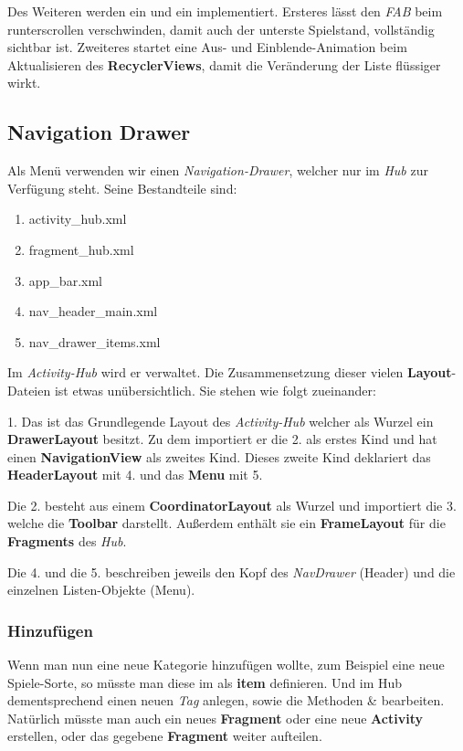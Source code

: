 Des Weiteren werden ein  und ein
 implementiert. Ersteres lässt den \emph{FAB}
beim runterscrollen verschwinden, damit auch der unterste Spielstand,
vollständig sichtbar ist. Zweiteres startet eine Aus- und Einblende-Animation
beim Aktualisieren des \textbf{RecyclerViews}, damit die Veränderung der Liste
flüssiger wirkt.

\subsection{Navigation Drawer}

Als Menü verwenden wir einen \emph{Navigation-Drawer}, welcher nur im \emph{Hub}
zur Verfügung steht. Seine Bestandteile sind:
\begin{enumerate}
\item activity\_hub.xml
\item fragment\_hub.xml
\item app\_bar.xml
\item nav\_header\_main.xml
\item nav\_drawer\_items.xml
\end{enumerate}

Im \emph{Activity-Hub} wird er verwaltet. Die Zusammensetzung dieser vielen
\textbf{Layout}-Dateien ist etwas unübersichtlich. Sie stehen wie folgt
zueinander:

1. Das ist das Grundlegende Layout des \emph{Activity-Hub} welcher als Wurzel
ein \textbf{DrawerLayout} besitzt. Zu dem importiert er die 2. als erstes Kind 
und hat einen \textbf{NavigationView} als zweites Kind. Dieses zweite Kind
deklariert das \textbf{HeaderLayout} mit 4. und das \textbf{Menu} mit 5.

Die 2. besteht aus einem \textbf{CoordinatorLayout} als Wurzel und importiert
die 3. welche die \textbf{Toolbar} darstellt. Außerdem enthält sie ein
\textbf{FrameLayout} für die \textbf{Fragments} des \emph{Hub}.

Die 4. und die 5. beschreiben jeweils den Kopf des \emph{NavDrawer} (Header) und
die einzelnen Listen-Objekte (Menu).

\subsubsection{Hinzufügen}
Wenn man nun eine neue Kategorie hinzufügen wollte, zum Beispiel eine neue
Spiele-Sorte, so müsste man diese im  als
\textbf{item} definieren. Und im Hub dementsprechend einen neuen \emph{Tag}
anlegen, sowie die Methoden  \&
 bearbeiten. Natürlich müsste man auch ein neues
\textbf{Fragment} oder eine neue \textbf{Activity} erstellen, oder das gegebene
\textbf{Fragment}  weiter aufteilen.


